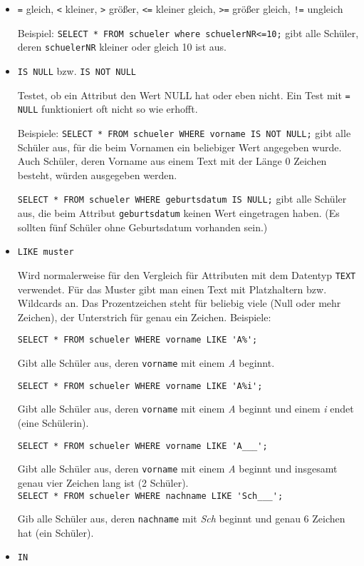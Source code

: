 \begin{itemize}
	\item \lstinline!=! gleich, \lstinline!<! kleiner, \lstinline!>! größer, \lstinline!<=! kleiner gleich, \lstinline!>=! größer gleich, \lstinline&!=& ungleich

	Beispiel: \lstinline!SELECT * FROM schueler where schuelerNR<=10;! gibt alle Schüler, deren \lstinline!schuelerNR! kleiner oder gleich 10 ist aus.
	\item \lstinline!IS NULL! bzw. \lstinline!IS NOT NULL!

	Testet, ob ein Attribut den Wert NULL hat oder eben nicht. Ein Test mit \lstinline|= NULL| funktioniert oft nicht so wie erhofft.

	Beispiele: 	\lstinline!SELECT * FROM schueler WHERE vorname IS NOT NULL;! gibt alle Schüler aus, für die beim Vornamen ein beliebiger Wert angegeben wurde. Auch Schüler, deren Vorname aus einem Text mit der Länge 0 Zeichen besteht, würden ausgegeben werden.

	\lstinline!SELECT * FROM schueler WHERE geburtsdatum IS NULL;! gibt alle Schüler aus, die beim Attribut \lstinline!geburtsdatum! keinen Wert eingetragen haben. (Es sollten fünf Schüler ohne Geburtsdatum vorhanden sein.)
	\item \lstinline!LIKE muster!

	Wird normalerweise für den Vergleich für Attributen mit dem Datentyp \lstinline!TEXT! verwendet. Für das Muster gibt man einen Text mit Platzhaltern bzw. Wildcards an. Das Prozentzeichen steht für beliebig viele (Null oder mehr Zeichen), der Unterstrich für genau ein Zeichen. Beispiele:

	\lstinline!SELECT * FROM schueler WHERE vorname LIKE 'A%';!

	Gibt alle Schüler aus, deren \lstinline!vorname! mit einem \textit{A} beginnt.

	\lstinline!SELECT * FROM schueler WHERE vorname LIKE 'A%i';!

	Gibt alle Schüler aus, deren \lstinline!vorname! mit einem \textit{A} beginnt und einem \textit{i} endet (eine Schülerin).

	\lstinline!SELECT * FROM schueler WHERE vorname LIKE 'A___';!

	Gibt alle Schüler aus, deren \lstinline!vorname! mit einem \textit{A} beginnt und insgesamt genau vier Zeichen lang ist (2 Schüler).\\
	\lstinline!SELECT * FROM schueler WHERE nachname LIKE 'Sch___';!

	Gib alle Schüler aus, deren \lstinline!nachname! mit \textit{Sch} beginnt und genau 6 Zeichen hat (ein Schüler).
	\item \lstinline!IN!


\end{itemize}
